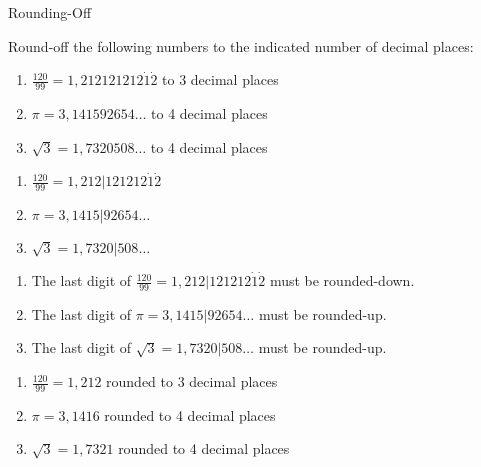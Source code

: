 \documentclass[10pt,a4paper,titlepage,twoside,openright]{report}
\begin{document}
\begin{wex}{Rounding-Off}{Round-off the following numbers to the indicated number of decimal places:
\begin{enumerate}
\item{$\frac{120}{99}=1,212121212\Dot{1}\Dot{2}$ to 3 decimal places}
\item{$\pi=3,141592654\ldots$ to 4 decimal places}
\item{$\sqrt{3}=1,7320508\ldots$ to 4 decimal places}
\end{enumerate}}{
\begin{enumerate}
\item{$\frac{120}{99}=1,212|121212\Dot{1}\Dot{2}$}
\item{$\pi=3,1415|92654\ldots$}
\item{$\sqrt{3}=1,7320|508\ldots$}
\end{enumerate}
\begin{enumerate}
\item{The last digit of $\frac{120}{99}=1,212|121212\Dot{1}\Dot{2}$ must be rounded-down.}
\item{The last digit of $\pi=3,1415|92654\ldots$ must be rounded-up.}
\item{The last digit of $\sqrt{3}=1,7320|508\ldots$ must be rounded-up.}
\end{enumerate}
\begin{enumerate}
\item{$\frac{120}{99}=1,212$ rounded to 3 decimal places}
\item{$\pi=3,1416$ rounded to 4 decimal places}
\item{$\sqrt{3}=1,7321$ rounded to 4 decimal places}
\end{enumerate}}
\end{wex}
\end{document}
